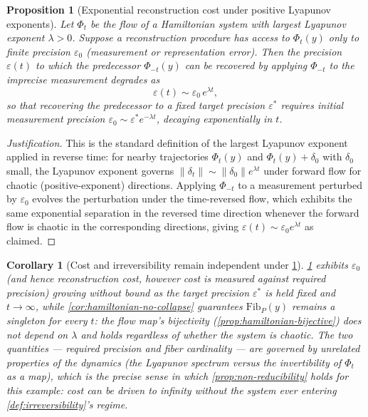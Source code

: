 \documentclass[11pt]{book}
\theoremstyle{plain}
\newtheorem{proposition}[theorem]{Proposition}
\newtheorem{corollary}[theorem]{Corollary}
\theoremstyle{definition}
\theoremstyle{remark}
\begin{document}
\begin{proposition}[Exponential reconstruction cost under positive Lyapunov exponents]
\label{app:prop-lyapunov}
Let $\Phi_t$ be the flow of a Hamiltonian system with largest Lyapunov
exponent $\lambda > 0$. Suppose a reconstruction procedure has access
to $\Phi_t(y)$ only to finite precision $\varepsilon_0$ (measurement or
representation error). Then the precision $\varepsilon(t)$ to which the
predecessor $\Phi_{-t}(y)$ can be recovered by applying $\Phi_{-t}$ to
the imprecise measurement degrades as
\[
\varepsilon(t) \sim \varepsilon_0 \, e^{\lambda t},
\]
so that recovering the predecessor to a fixed target precision
$\varepsilon^*$ requires initial measurement precision
$\varepsilon_0 \sim \varepsilon^* e^{-\lambda t}$, decaying
exponentially in $t$.
\end{proposition}

\begin{proof}[Justification]
This is the standard definition of the largest Lyapunov exponent
applied in reverse time: for nearby trajectories $\Phi_t(y)$ and
$\Phi_t(y) + \delta_0$ with $\delta_0$ small, the Lyapunov exponent
governs $\|\delta_t\| \sim \|\delta_0\| e^{\lambda t}$ under forward
flow for chaotic (positive-exponent) directions. Applying $\Phi_{-t}$
to a measurement perturbed by $\varepsilon_0$ evolves the perturbation
under the time-reversed flow, which exhibits the same exponential
separation in the reversed time direction whenever the forward flow is
chaotic in the corresponding directions, giving
$\varepsilon(t) \sim \varepsilon_0 e^{\lambda t}$ as claimed.
\end{proof}

\begin{corollary}[Cost and irreversibility remain independent under \cref{app:prop-lyapunov}]
\label{app:cor-lyapunov-independence}
\cref{app:prop-lyapunov} exhibits $\varepsilon_0$ (and hence
reconstruction cost, however cost is measured against required
precision) growing without bound as the target precision $\varepsilon^*$
is held fixed and $t \to \infty$, while
\cref{cor:hamiltonian-no-collapse} guarantees $\mathrm{Fib}_P(y)$
remains a singleton for every $t$: the flow map's bijectivity
(\cref{prop:hamiltonian-bijective}) does not depend on $\lambda$ and
holds regardless of whether the system is chaotic. The two
quantities --- required precision and fiber cardinality --- are
governed by unrelated properties of the dynamics (the Lyapunov
spectrum versus the invertibility of $\Phi_t$ as a map), which is the
precise sense in which \cref{prop:non-reducibility} holds for this
example: cost can be driven to infinity without the system ever
entering \cref{def:irreversibility}'s regime.
\end{corollary}
\end{document}
